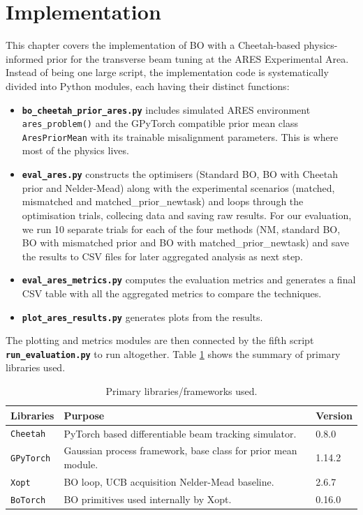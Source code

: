 \section{Implementation}	\label{a:ab_rts_en}

This chapter covers the implementation of BO with a Cheetah-based physics-informed prior for the transverse beam tuning at the ARES Experimental Area. 
Instead of being one large script, the implementation code is systematically divided into Python modules, each having their distinct functions:
\begin{itemize}
    \item \textbf{\texttt{bo\_cheetah\_prior\_ares.py}} includes simulated ARES environment \texttt{ares\_problem()} and the GPyTorch compatible prior mean class \texttt{AresPriorMean} with its trainable  misalignment parameters. This is where most of the physics lives.
    \item \textbf{\texttt{eval\_ares.py}} constructs the optimisers (Standard BO, BO with Cheetah prior and Nelder-Mead) along with the experimental scenarios (matched, mismatched and matched\_prior\_newtask) and loops through the optimisation trials, collecing data and saving raw results. For our evaluation, we run 10 separate trials for each of the four methods (NM, standard BO, BO with mismatched prior and BO with matched\_prior\_newtask) and save the results to CSV files for later aggregated analysis as next step.
    \item \textbf{\texttt{eval\_ares\_metrics.py}} computes the evaluation metrics and generates a final CSV table with all the aggregated metrics to compare the techniques. 
    \item \textbf{\texttt{plot\_ares\_results.py}} generates plots from the results. 
\end{itemize}

The plotting and metrics modules are then connected by the fifth script \textbf{\texttt{run\_evaluation.py}} to run altogether. Table \ref{table:libraries} shows the summary of primary libraries used. 

\begin{table} [htbp]
    \centering
    \small
    \begin{tabular}{p{2.5cm} p{5.5cm} p{1.5cm}}
        \toprule
        \textbf{Libraries} & \textbf{Purpose} & \textbf{Version} \\
        \midrule
        \texttt{Cheetah} & PyTorch based differentiable beam tracking simulator. & 0.8.0 \\
        \texttt{GPyTorch} & Gaussian process framework, base class for prior mean module. & 1.14.2 \\ 
        \texttt{Xopt} & BO loop, UCB acquisition Nelder-Mead baseline. & 2.6.7 \\ 
        \texttt{BoTorch} & BO primitives used internally by Xopt. & 0.16.0 \\ 
        \bottomrule
    \end{tabular}
    \caption{Primary libraries/frameworks used.}
    \label{table:libraries}
\end{table}

